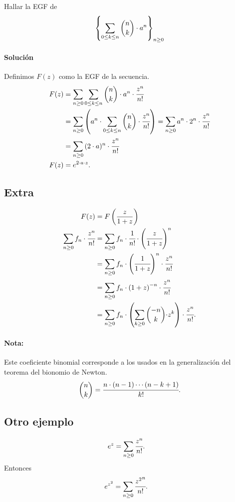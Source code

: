Hallar la EGF de
\begin{align*}
\left\{\sum_{0\leq k\leq n}{\binom{n}{k}\cdot a^{n}}\right\}_{n\geq0}
\end{align*}

\paragraph{Solución}

Definimos $F(z)$ como la EGF de la secuencia.
\begin{align*}
F(z)&=\sum_{n\geq0}{\sum_{0\leq k\leq n}{\binom{n}{k}\cdot a^{n}}\cdot\cfrac{z^{n}}{n!}}\\
&=\sum_{n\geq0}{\left(a^n\cdot \sum_{0\leq k\leq n}{\binom{n}{k}}\cdot\cfrac{z^{n}}{n!}\right)}=\sum_{n\geq0}{a^n\cdot 2^n\cdot \cfrac{z^{n}}{n!}}\\
&=\sum_{n\geq0}{(2\cdot a)^n\cdot\cfrac{z^{n}}{n!}}\\
F(z)&=e^{2\cdot a\cdot z}.
\end{align*}

\clearpage
\subsection*{Extra}
\begin{align*}
	F(z)&=F\left(\frac{z}{1+z}\right)\\
	\sum_{n\geq0}{f_n\cdot \cfrac{z^{n}}{n!}}&=\sum_{n\geq0}{f_n\cdot\cfrac{1}{n!}\cdot\left(\cfrac{z}{1+z}\right)^n}\\
	&=\sum_{n\geq0}{f_n\cdot\left(\cfrac{1}{1+z}\right)^n\cdot\cfrac{z^{n}}{n!}}\\
	&=\sum_{n\geq0}{f_n\cdot\left(1+z\right)^{-n}\cdot\cfrac{z^{n}}{n!}}\\
	&=\sum_{n\geq0}{f_n\cdot\left(\sum_{k\geq0}{\binom{-n}{k}\cdot}z^k\right)\cdot\cfrac{z^{n}}{n!}.}
\end{align*}
\paragraph{Nota:} Este coeficiente binomial corresponde a los usados en la generalización del teorema del bionomio de Newton.
\begin{align*}
\binom{n}{k}=\cfrac{n\cdot(n-1)\cdots(n-k+1)}{k!}.
\end{align*}

\subsection*{Otro ejemplo}

\begin{align*}
e^z&=\sum_{n\geq0}{\cfrac{z^{n}}{n!}}.
\end{align*}
Entonces
\begin{align*}
e^{z^2}&=\sum_{n\geq0}{\cfrac{{z^2}^n}{n!}}.
\end{align*}
